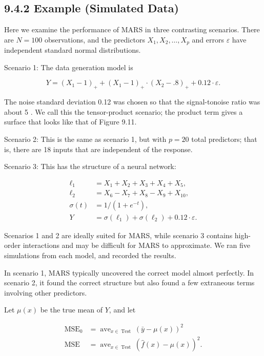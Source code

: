 \documentclass[10pt]{article}
\begin{document}
\subsection*{9.4.2 Example (Simulated Data)}
Here we examine the performance of MARS in three contrasting scenarios. There are $N=100$ observations, and the predictors $X_{1}, X_{2}, \ldots, X_{p}$ and errors $\varepsilon$ have independent standard normal distributions.

Scenario 1: The data generation model is


\begin{equation*}
Y=\left(X_{1}-1\right)_{+}+\left(X_{1}-1\right)_{+} \cdot\left(X_{2}-.8\right)_{+}+0.12 \cdot \varepsilon . \tag{9.21}
\end{equation*}


The noise standard deviation 0.12 was chosen so that the signal-tonoise ratio was about 5 . We call this the tensor-product scenario; the product term gives a surface that looks like that of Figure 9.11.

Scenario 2: This is the same as scenario 1, but with $p=20$ total predictors; that is, there are 18 inputs that are independent of the response.

Scenario 3: This has the structure of a neural network:


\begin{align*}
\ell_{1} & =X_{1}+X_{2}+X_{3}+X_{4}+X_{5}, \\
\ell_{2} & =X_{6}-X_{7}+X_{8}-X_{9}+X_{10},  \tag{9.22}\\
\sigma(t) & =1 /\left(1+e^{-t}\right), \\
Y & =\sigma\left(\ell_{1}\right)+\sigma\left(\ell_{2}\right)+0.12 \cdot \varepsilon .
\end{align*}


Scenarios 1 and 2 are ideally suited for MARS, while scenario 3 contains high-order interactions and may be difficult for MARS to approximate. We ran five simulations from each model, and recorded the results.

In scenario 1, MARS typically uncovered the correct model almost perfectly. In scenario 2, it found the correct structure but also found a few extraneous terms involving other predictors.

Let $\mu(x)$ be the true mean of $Y$, and let


\begin{align*}
\operatorname{MSE}_{0} & =\operatorname{ave}_{x \in \operatorname{Test}}(\bar{y}-\mu(x))^{2} \\
\operatorname{MSE} & =\operatorname{ave}_{x \in \operatorname{Test}}(\hat{f}(x)-\mu(x))^{2} . \tag{9.23}
\end{align*}
\end{document}
